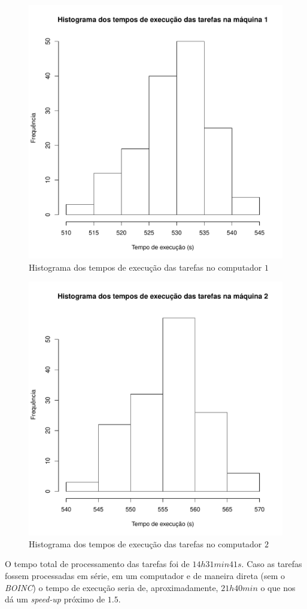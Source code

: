 \begin{figure}[!ht]
	\includegraphics[scale=0.8]{hist1.pdf}

	\caption{Histograma dos tempos de execução das tarefas no computador $1$}
	\label{hist_comp1}
\end{figure}


\begin{figure}[!ht]
	\includegraphics[scale=0.8]{hist2.pdf}

	\caption{Histograma dos tempos de execução das tarefas no computador $2$}
	\label{hist_comp2}	
\end{figure}



O tempo total de processamento das tarefas foi de $14h31min41s$. Caso as tarefas fossem processadas
em série, em um computador e de maneira direta (sem o \emph{BOINC})
o tempo de execução seria de, aproximadamente, $21h40min$ o que nos dá um \emph{speed-up} 
próximo de $1.5$.








